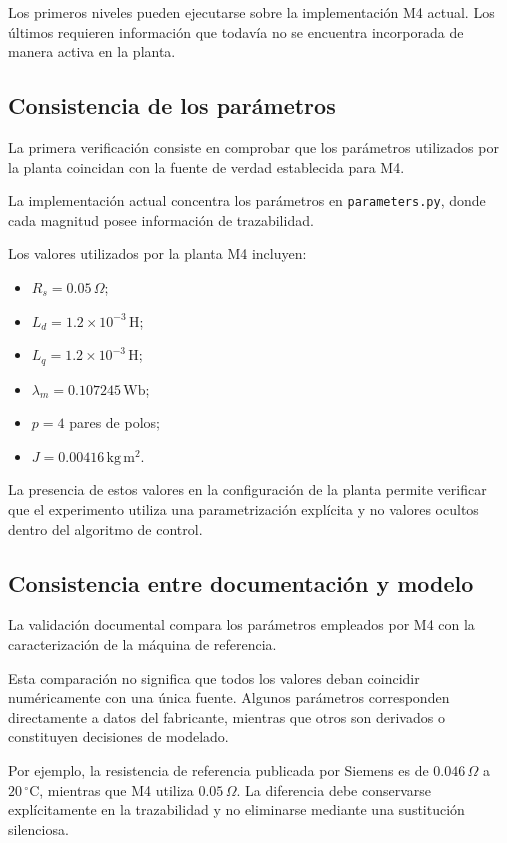 Los primeros niveles pueden ejecutarse sobre la implementación M4 actual. Los últimos requieren información que todavía no se encuentra incorporada de manera activa en la planta.

\subsection{Consistencia de los parámetros}

La primera verificación consiste en comprobar que los parámetros utilizados por la planta coincidan con la fuente de verdad establecida para M4.

La implementación actual concentra los parámetros en \texttt{parameters.py}, donde cada magnitud posee información de trazabilidad.

Los valores utilizados por la planta M4 incluyen:

\begin{itemize}
    \item $R_s=0.05\,\Omega$;
    \item $L_d=1.2\times10^{-3}\,\mathrm{H}$;
    \item $L_q=1.2\times10^{-3}\,\mathrm{H}$;
    \item $\lambda_m=0.107245\,\mathrm{Wb}$;
    \item $p=4$ pares de polos;
    \item $J=0.00416\,\mathrm{kg\,m^2}$.
\end{itemize}

La presencia de estos valores en la configuración de la planta permite verificar que el experimento utiliza una parametrización explícita y no valores ocultos dentro del algoritmo de control.

\subsection{Consistencia entre documentación y modelo}

La validación documental compara los parámetros empleados por M4 con la caracterización de la máquina de referencia.

Esta comparación no significa que todos los valores deban coincidir numéricamente con una única fuente. Algunos parámetros corresponden directamente a datos del fabricante, mientras que otros son derivados o constituyen decisiones de modelado.

Por ejemplo, la resistencia de referencia publicada por Siemens es de $0.046\,\Omega$ a $20\,^{\circ}\mathrm{C}$, mientras que M4 utiliza $0.05\,\Omega$. La diferencia debe conservarse explícitamente en la trazabilidad y no eliminarse mediante una sustitución silenciosa.


